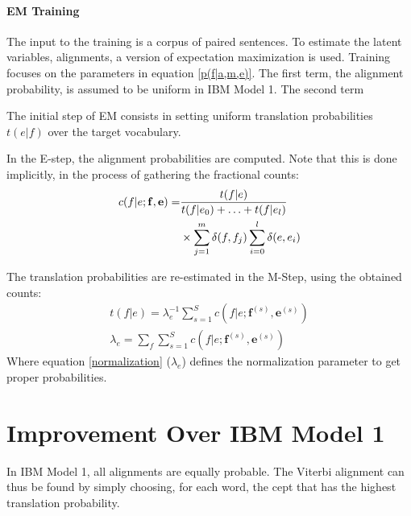 \documentclass[11pt]{article}
\renewcommand{\vec}[1]{\mathbf{#1}}
\begin{document}


\paragraph{EM Training}
The input to the training is a corpus of paired sentences.
To estimate the latent variables, alignments, a version of expectation maximization is used.
Training focuses on the parameters in equation \ref{p(f|a,m,e)}. The first term, the alignment probability, is assumed to be uniform in IBM Model 1. The second term 

 The initial step of EM consists in setting uniform translation probabilities $t(e|f)$ over the target vocabulary. 

In the E-step, the alignment probabilities are computed. Note that this is done implicitly, in the process of gathering the fractional counts:
\begin{align}
c(f|e;\vec{f},\vec{e}) =& 
\frac{t(f|e)}{t(f|e_0)+\ldots+t(f|e_l)} \notag\\
&\times \sum_{j=1}^m \delta(f,f_j) \sum_{i=0}^l \delta(e,e_i)
\end{align}

The translation probabilities are re-estimated in the M-Step, using the obtained counts:
\begin{align}
t(f|e) = \lambda_e^{-1} \sum_{s=1}^S c(f|e;\vec{f}^{(s)},\vec{e}^{(s)})\\ 
\lambda_e = \sum_f\sum_{s=1}^S c(f|e;\vec{f}^{(s)},\vec{e}^{(s)}) \label{normalization}
\end{align}
Where equation \ref{normalization} ($\lambda_e$) defines the normalization parameter to get proper probabilities.


\section{Improvement Over IBM Model 1}
\label{Improvement}

In IBM Model 1, all alignments are equally probable. The Viterbi alignment can thus be found by simply choosing, for each word, the cept that has the highest translation probability. 
\end{document}
